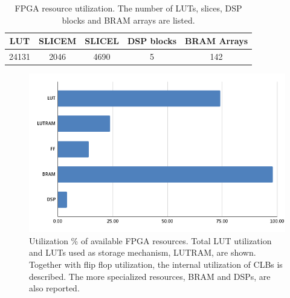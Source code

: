 \documentclass[12pt]{report}
\begin{document}
\begin{table}[h]
    \centering
    \begin{tabular}{|c|c|c|c|c|}
        \hline
        \textbf{LUT}& \textbf{SLICEM}& \textbf{SLICEL}& \textbf{DSP blocks}& \textbf{BRAM Arrays}\\
        \hline
        24131&2046&4690&5&142\\
        \hline
    \end{tabular}
    \caption{FPGA resource utilization. The number of LUTs, slices, DSP blocks and BRAM arrays are listed.}
    \label{table:fpga_res}
\end{table}

\begin{figure}[h]
    \centering
    \includegraphics[scale=0.65]{figures/utilization.png}
    \caption{Utilization \% of available FPGA resources. Total LUT utilization and LUTs used as storage mechanism, LUTRAM, are shown. Together with flip flop utilization, the internal utilization of CLBs is described. The more specialized resources, BRAM and DSPs, are also reported.}
    \label{fig:fpga_util}
\end{figure}
\end{document}
